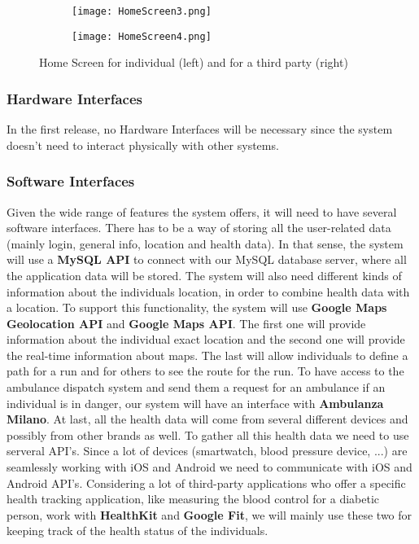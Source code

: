 \documentclass[12pt]{article}
\begin{document}
\begin{figure}[H]
\centering
    \begin{subfigure}{.4\textwidth}
        \texttt{[image: HomeScreen3.png]}
        \label{fig:HomeScreen1}
    \end{subfigure}%
    \begin{subfigure}{.4\textwidth}
        \texttt{[image: HomeScreen4.png]}
        \label{fig:HomeScreen2}
    \end{subfigure}
    \caption{Home Screen for individual (left) and for a third party (right)}
\end{figure}


\subsubsection{Hardware Interfaces}
In the first release, no Hardware Interfaces will be necessary since the system doesn’t need to interact physically with other systems.
\subsubsection{Software Interfaces}
Given the wide range of features the system offers, it will need to have several software interfaces. There has to be a way of storing all the user-related data (mainly login, general info, location and health data). In that sense, the system will use a \textbf{MySQL API} to connect with our MySQL database server, where all the application data will be stored. The system will also need different kinds of information about the individuals location, in order to combine health data with a location. To support this functionality, the system will use \textbf{Google Maps Geolocation API} and \textbf{Google Maps API}. The first one will provide information about the individual exact location and the second one will provide the real-time information about maps. The last will allow individuals to define a path for a run and for others to see the route for the run. To have access to the ambulance dispatch system and send them a request for an ambulance if an individual is in danger, our system will have an interface with \textbf{Ambulanza Milano}. At last, all the health data will come from several different devices and possibly from other brands as well. To gather all this health data we need to use serveral API's. Since a lot of devices (smartwatch, blood pressure device, ...) are seamlessly working with iOS and Android we need to communicate with iOS and Android API's. Considering a lot of third-party applications who offer a specific health tracking application, like measuring the blood control for a diabetic person, work with \textbf{HealthKit} and \textbf{Google Fit}, we will mainly use these two for keeping track of the health status of the individuals. 
\end{document}
